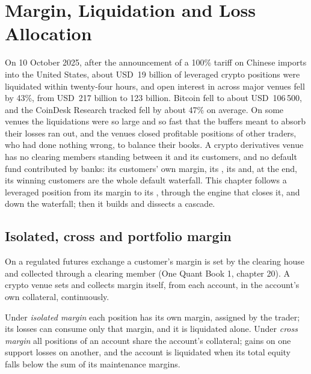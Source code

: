 \chapter{Margin, Liquidation and Loss Allocation}\label{ch:m3:margin-liquidation-and-loss-allocation}

On 10 October 2025, after the announcement of a 100\% tariff on Chinese imports into the United States,
about USD~19 billion of leveraged crypto positions were liquidated within twenty-four hours, and open interest in
 across major venues fell by 43\%, from USD~217 billion to 123 billion. Bitcoin fell
to about USD~106\,500, and the  CoinDesk Research tracked fell by about 47\% on average. On some venues the
liquidations were so large and so fast that the buffers meant to absorb their losses ran out, and the
venues closed profitable positions of other traders, who had done nothing wrong, to balance their books.
A crypto derivatives venue has no clearing members standing between it and its customers, and no default
fund contributed by banks: its customers' own margin, its , its  and, at
the end, its winning customers are the whole default waterfall. This chapter follows a leveraged position
from its margin to its , through the engine that closes it, and down the waterfall; then
it builds and dissects a cascade.

\section{Isolated, cross and portfolio margin}

On a regulated futures exchange a customer's margin is set by the clearing house and collected through a
clearing member (One Quant Book 1, chapter 20). A crypto venue sets and collects margin itself, from each
account, in the account's own collateral, continuously.

\begin{definition}\label{def:m3:margin-liquidation-and-loss-allocation:modes}
Under \emph{isolated margin} each position has its own margin, assigned by the trader;
its losses can consume only that margin, and it is liquidated alone. Under \emph{cross
margin} all positions of an account share the account's collateral; gains on one support
losses on another, and the account is liquidated when its total equity falls below the sum of its
maintenance margins.
\end{definition}


